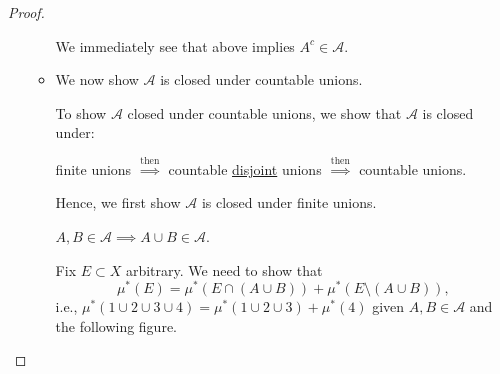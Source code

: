 \begin{proof}
\begin{enumerate}[(1)]
\begin{itemize}
\begin{explanation}
				            We immediately see that above implies \(A^{c} \in\mathcal{A} \).
			            \end{explanation}
			      \item We now show \(\mathcal{A} \) is closed under countable unions.
			            \begin{note}
				            To show \(\mathcal{A} \) closed under countable unions, we show that \(\mathcal{A}\) is closed under:
				            \begin{center}
					            finite unions \(\overset{\text{then}}{\implies}\) countable \underline{disjoint} unions \(\overset{\text{then}}{\implies}\) countable unions.
				            \end{center}
			            \end{note}
			            Hence, we first show \(\mathcal{A} \) is closed under finite unions.
			            \begin{claim}\label{pf:Caratheodory-extension-Thm-1-finite-unions}
				            \(A, B\in \mathcal{A} \implies A\cup B\in \mathcal{A}\).
			            \end{claim}
			            \begin{explanation}
				            Fix \(E\subset X\) arbitrary. We need to show that
				            \[
					            \mu^{\ast} (E) = \mu^{\ast} (E\cap (A\cup B)) + \mu^{\ast} (E\setminus (A\cup B)),
				            \]
				            i.e.,
				            \(\mu^{\ast} (1\cup 2\cup 3\cup 4) = \mu^{\ast} (1\cup 2\cup 3) + \mu^{\ast} (4)\) given \(A, B\in\mathcal{A}\) and the following figure.
				            \begin{figure}[H]
					            \centering
					            \label{fig:thm:Caratheodory-extension-Thm-1a}
				            \end{figure}


\end{explanation}
\end{itemize}
\end{enumerate}
\end{proof}
